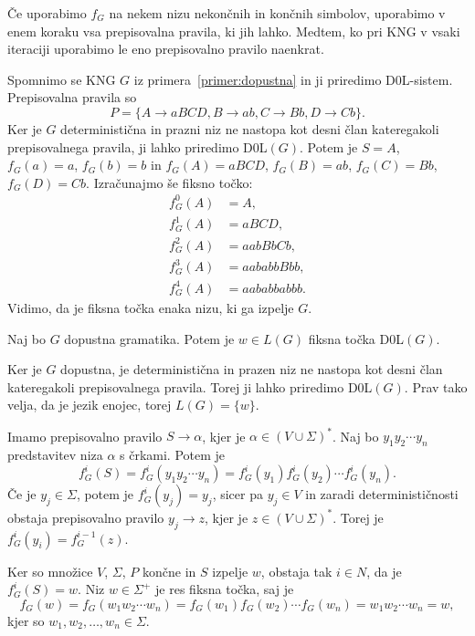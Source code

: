 \documentclass[fin1, tisk]{fmfdelo}
\theoremstyle{definition}
\begin{document}
Če uporabimo $f_G$ na nekem nizu nekončnih in končnih simbolov, uporabimo v enem koraku vsa 
prepisovalna pravila, ki jih lahko. Medtem, ko pri KNG v vsaki 
iteraciji uporabimo le eno prepisovalno pravilo naenkrat.

\begin{primer}\label{primer:fiksna}
    Spomnimo se KNG $G$ iz primera~\ref{primer:dopustna} in ji priredimo D$0$L-sistem. Prepisovalna
    pravila so
    \[
        P = \{ A \rightarrow \mathit{aBCD}, B \rightarrow \mathit{ab}, C \rightarrow 
        \mathit{Bb}, D \rightarrow \mathit{Cb} \}.
    \] 
    Ker je $G$ deterministična in prazni niz ne nastopa kot desni član kateregakoli prepisovalnega
    pravila, ji lahko priredimo D$0$L$(G)$. Potem je $S = A$, $f_G(a) = a$, $f_G(b) = b$ in 
    $f_G(A) = aBCD$, $f_G(B) = ab$, $f_G(C) = Bb$, $f_G(D) = Cb$. Izračunajmo še fiksno točko:
    \begin{align*}
        f_G^0(A) &= A, \\
        f_G^1(A) &= \mathit{aBCD}, \\
        f^2_G(A) &= \mathit{aabBbCb}, \\
        f^3_G(A) &= \mathit{aababbBbb}, \\
        f^4_G(A) &= \mathit{aababbabbb}.
    \end{align*}
    Vidimo, da je fiksna točka enaka nizu, ki ga izpelje $G$.
\end{primer}

\begin{trditev}\label{trditev:fiksna}
    Naj bo $G$ dopustna gramatika. Potem je $ w \in L(G)$ fiksna točka D0L$(G)$.
\end{trditev}

\begin{dokaz}
    Ker je $G$ dopustna, je deterministična in prazen niz ne nastopa kot desni član kateregakoli
    prepisovalnega pravila. Torej ji lahko priredimo D$0$L$(G)$. Prav tako velja, da je jezik 
    enojec, torej $L(G) = \{ w \}$.
    
    Imamo prepisovalno pravilo $S \rightarrow \alpha$, kjer je $\alpha \in (V \cup \Sigma)^*$.
    Naj bo $y_1 y_2 \cdots y_n$ predstavitev niza $\alpha$ s črkami. Potem je
    \[
        f^i_G(S) = f^i_G(y_1 y_2 \cdots y_n) = f^i_G(y_1)f^i_G(y_2) \cdots f^i_G(y_n).
    \]
    Če je $y_j \in \Sigma$, potem je $f^i_G(y_j) = y_j$, sicer pa $y_j \in V$ in zaradi 
    determinističnosti obstaja prepisovalno pravilo $y_j \rightarrow z$, kjer je 
    $z \in (V \cup \Sigma)^*$. Torej je $f^i_G(y_i) = f^{i-1}_G(z)$. 
    
    Ker so množice $V$, $\Sigma$, $P$ končne in $S$ izpelje $w$, obstaja tak $i \in N$, da je 
    $f^i_G(S) = w$. Niz $ w \in \Sigma^+ $ je res fiksna točka, saj je 
    \[
        f_G(w) = f_G(w_1w_2 \cdots w_n) = f_G(w_1)f_G(w_2) \cdots f_G(w_n) = w_1w_2 \cdots w_n = w,
    \]
    kjer so $w_1, w_2, \ldots, w_n \in \Sigma$.
\end{dokaz}
\end{document}
